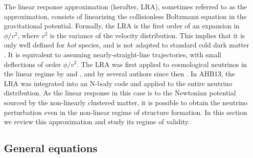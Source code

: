 \documentclass[useAMS, usenatbib]{mnras}
\begin{document}
The linear response approximation (herafter, LRA), sometimes referred to as the \cite{Gilbert_1966} approximation, consists of linearizing the collisionless Boltzmann equation in the gravitational potential. Formally, the LRA is the first order of an expansion in $\phi/v^2$, where $v^2$ is the variance of the velocity distribution. This implies that it is only well defined for \emph{hot} species, and is not adapted to standard cold dark matter \citep{YAH_15}. It is equivalent to assuming nearly-straight-line trajectories, with small deflections of order $\phi/v^2$. The LRA was first applied to cosmological neutrinos in the linear regime by \cite{Bond_Szalay_1983} and \cite{Brandenberger_1987}, and by several authors since then \citep{Singh_Ma_2003, Ringwald_Wong_2004}. In AHB13, the LRA was integrated into an N-body code and applied to the entire neutrino distribution. As the linear response in this case is to the Newtonian potential sourced by the non-linearly clustered matter, it is possible to obtain the neutrino perturbation even in the non-linear regime of structure formation. In this section we review this approximation and study its regime of validity.

\subsection{General equations}
\end{document}
